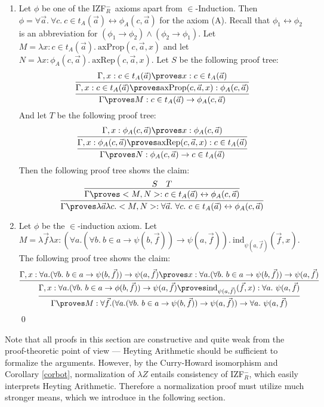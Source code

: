 \documentclass{LMCS}
\newcommand\iffl{\ensuremath{\leftrightarrow}}
\newcommand{\p}{\proves}
\newcommand{\g}{\Gamma}
\newcommand{\gp}{\Gamma \proves}
\newcommand{\pl}[1]{\ensuremath{\mathrm{#1}}}
\newcommand{\IND}{\pl{ind}}
\newcommand{\iizfr}{IZF${}_R^{-}$}
\newcommand{\lz}{\lambda Z}
\begin{document}
\begin{enumerate}[$\bullet$]
\item Let $\phi$ be one of the \iizfr\ axioms apart from $\in$-Induction.
Then $\phi = \forall \vec{a}.\ \forall c.\ c \in t_A(\vec{a}) \iffl \phi_A(c,
\vec{a})$ for the axiom (A). Recall that $\phi_1 \iffl \phi_2$ is an
abbreviation for $(\phi_1 \to \phi_2) \land (\phi_2 \to \phi_1)$. Let $M = \lambda x : c \in t_A(\vec{a}).\ \pl{axProp}(c, \vec{a}, x)$
and let $N = \lambda x : \phi_A(c, \vec{a}).\ \pl{axRep}(c, \vec{a}, x)$. 
Let $S$ be the following proof tree:
\[
    \infer
    {
    \gp M : c \in t_A(\vec{a}) \to \phi_A(c, \vec{a})
    }
    {
      \infer{\g, x : c \in t_A(\vec{a}) \p \pl{axProp}(c, \vec{a}, x) : \phi_A(c, \vec{a})}
      {
       \g, x : c \in t_A(\vec{a}) \p x : c \in t_A(\vec{a})
      }
    }
\]
And let $T$ be the following proof tree:
\[
    \infer{\gp N : \phi_A(c, \vec{a}) \to c \in t_A(\vec{a})}
    {
      \infer{\g, x : \phi_A(c, \vec{a}) \p \pl{axRep}(c, \vec{a}, x) : c \in t_A(\vec{a})}
      {
        \g, x : \phi_A(c, \vec{a}) \p x : \phi_A(c, \vec{a})
      }
    }
\]
Then the following proof tree shows the claim:
\[
\infer{\gp \lambda \vec{a} \lambda c. 
<M, N> : \forall \vec{a}.\ \forall c.\ c \in t_A(\vec{a}) \iffl \phi_A(c, \vec{a})}
{
  \infer
  {\gp <M, N> : c \in t_A(\vec{a}) \iffl \phi_A(c, \vec{a})}
  {
  S & T
  }
}
\]
\item Let $\phi$ be the $\in$-induction axiom. Let $M = \lambda \vec{f} \lambda x : (\forall a.
(\forall b.\ b \in a \to \psi(b, \vec{f})) \to \psi(a, \vec{f})).\
\IND_{\psi(a, \vec{f})}(\vec{f}, x)$.
The following proof tree shows the claim:
\[
\infer{\gp M : \forall \vec{f}. (\forall a. (\forall b.\ b \in a \to
\psi(b, \vec{f})) \to \psi(a, \vec{f})) \to \forall a.\ \psi(a, \vec{f})}
{
  \infer{\g, x : \forall a. (\forall b.\ b \in a \to \phi(b, \vec{f})) \to
\psi(a, \vec{f}) \p \IND_{\psi(a, \vec{f})}(\vec{f}, x) : \forall a.\ \psi(a, \vec{f})}
  {
    \g, x : \forall a. (\forall b.\ b \in a \to \psi(b, \vec{f})) \to
\psi(a, \vec{f}) \p x : \forall a. (\forall b.\ b \in a \to \psi(b, \vec{f})) \to
\psi(a, \vec{f})
  }
}
\]\qed
\end{enumerate}

Note that all proofs in this section are constructive and quite weak from
the proof-theoretic point of view --- Heyting Arithmetic should be
sufficient to formalize the arguments. However, by the Curry-Howard isomorphism
and Corollary \ref{corbot}, normalization of $\lz$ entails consistency of \iizfr,
which easily interprets Heyting Arithmetic. Therefore a normalization
proof must utilize much stronger means, which we introduce in the following
section. 
\end{document}
